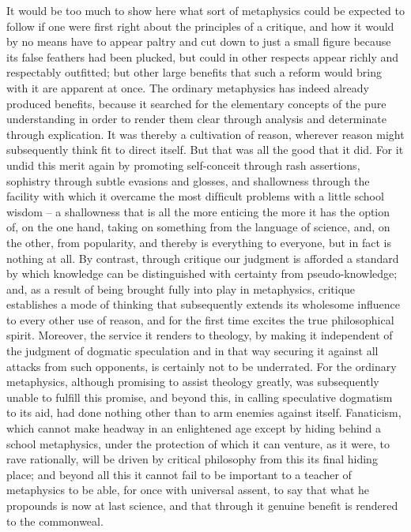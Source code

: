 It would be too much to show here what sort of metaphysics could be
expected to follow if one were ﬁrst right about the principles of a critique,
and how it would by no means have to appear paltry and cut down to just a
small ﬁgure because its false feathers had been plucked, but could in other
respects appear richly and respectably outﬁtted; but other large beneﬁts
that such a reform would bring with it are apparent at once. The ordinary
metaphysics has indeed already produced beneﬁts, because it searched
for the elementary concepts of the pure understanding in order to render
them clear through analysis and determinate through explication. It was
thereby a cultivation of reason, wherever reason might subsequently
think ﬁt to direct itself. But that was all the good that it did. For it
undid this merit again by promoting self-conceit through rash assertions,
sophistry through subtle evasions and glosses, and shallowness through
the facility with which it overcame the most difﬁcult problems with a little
school wisdom – a shallowness that is all the more enticing the more it has
the option of, on the one hand, taking on something from the language
of science, and, on the other, from popularity, and thereby is everything
to everyone, but in fact is nothing at all. By contrast, through critique our
judgment is afforded a standard by which knowledge can be distinguished
with certainty from pseudo-knowledge; and, as a result of being brought
fully into play in metaphysics, critique establishes a mode of thinking
that subsequently extends its wholesome inﬂuence to every other use
of reason, and for the ﬁrst time excites the true philosophical spirit.
Moreover, the service it renders to theology, by making it independent of
the judgment of dogmatic speculation and in that way securing it against
all attacks from such opponents, is certainly not to be underrated. For the
ordinary metaphysics, although promising to assist theology greatly, was
subsequently unable to fulﬁll this promise, and beyond this, in calling
speculative dogmatism to its aid, had done nothing other than to arm
enemies against itself. Fanaticism, which cannot make headway in an
enlightened age except by hiding behind a school metaphysics, under
the protection of which it can venture, as it were, to rave rationally,
will be driven by critical philosophy from this its ﬁnal hiding place; and
beyond all this it cannot fail to be important to a teacher of metaphysics
to be able, for once with universal assent, to say that what he propounds
is now at last science, and that through it genuine beneﬁt is rendered to
the commonweal.
